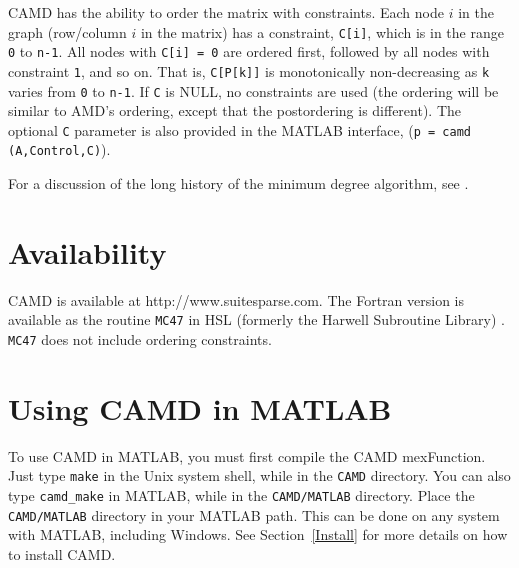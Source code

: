 \documentclass[11pt]{article}
\begin{document}
CAMD has the ability to order the matrix with constraints.  Each
node $i$ in the graph (row/column $i$ in the matrix) has a constraint,
{\tt C[i]}, which is in the range {\tt 0} to {\tt n-1}.  All nodes with
{\tt C[i] = 0} are
ordered first, followed by all nodes with constraint {\tt 1}, and so on.
That is, {\tt C[P[k]]} is monotonically non-decreasing as {\tt k} varies from
{\tt 0} to {\tt n-1}.  If {\tt C} is NULL, no
constraints are used (the ordering will be similar to AMD's ordering,
except that the postordering is different).
The optional {\tt C} parameter is also provided in the MATLAB interface,
({\tt p = camd (A,Control,C)}).

For a discussion of the long history of the minimum degree algorithm,
see \cite{GeorgeLiu89}.

\section{Availability}

CAMD is available at http://www.suitesparse.com.
The Fortran version is available as the routine {\tt MC47} in HSL
(formerly the Harwell Subroutine Library) \cite{hsl:2002}. {\tt MC47} does
not include ordering constraints.

\section{Using CAMD in MATLAB}

To use CAMD in MATLAB, you must first compile the CAMD mexFunction.
Just type {\tt make} in the Unix system shell, while in the {\tt CAMD}
directory.  You can also type {\tt camd\_make} in MATLAB, while in the
{\tt CAMD/MATLAB} directory.  Place the {\tt CAMD/MATLAB} directory in your
MATLAB path.  This can be done on any system with MATLAB, including Windows.
See Section~\ref{Install} for more details on how to install CAMD.
\end{document}
